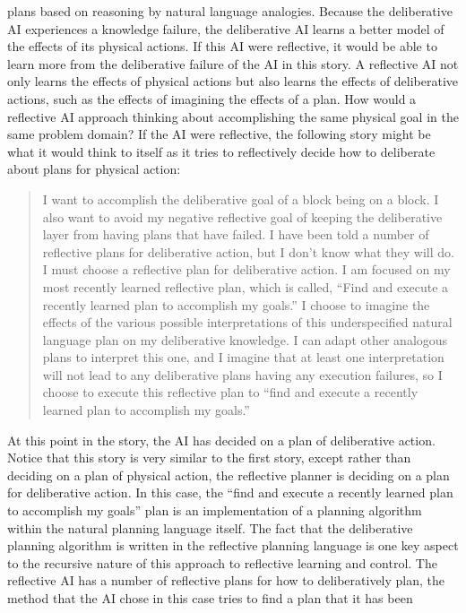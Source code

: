 plans based on reasoning by natural language analogies.  Because the
deliberative AI experiences a knowledge failure, the deliberative AI
learns a better model of the effects of its physical actions.  If this
AI were reflective, it would be able to learn more from the
deliberative failure of the AI in this story.  A reflective AI not
only learns the effects of physical actions but also learns the
effects of deliberative actions, such as the effects of imagining the
effects of a plan.  How would a reflective AI approach thinking about
accomplishing the same physical goal in the same problem domain?  If
the AI were reflective, the following story might be what it would
think to itself as it tries to reflectively decide how to deliberate
about plans for physical action:
\begin{quote}
  I want to accomplish the deliberative goal of a block being on a
  block.  I also want to avoid my negative reflective goal of keeping
  the deliberative layer from having plans that have failed.  I have
  been told a number of reflective plans for deliberative action, but
  I don't know what they will do.  I must choose a reflective plan for
  deliberative action.  I am focused on my most recently learned
  reflective plan, which is called, ``Find and execute a recently
  learned plan to accomplish my goals.''  I choose to imagine the
  effects of the various possible interpretations of this
  underspecified natural language plan on my deliberative knowledge.
  I can adapt other analogous plans to interpret this one, and I
  imagine that at least one interpretation will not lead to any
  deliberative plans having any execution failures, so I choose to
  execute this reflective plan to ``find and execute a recently
  learned plan to accomplish my goals.''
\end{quote}
At this point in the story, the AI has decided on a plan of
deliberative action.  Notice that this story is very similar to the
first story, except rather than deciding on a plan of physical action,
the reflective planner is deciding on a plan for deliberative action.
In this case, the ``find and execute a recently learned plan to
accomplish my goals'' plan is an implementation of a planning
algorithm within the natural planning language itself.  The fact that
the deliberative planning algorithm is written in the reflective
planning language is one key aspect to the recursive nature of this
approach to reflective learning and control.  The reflective AI has a
number of reflective plans for how to deliberatively plan, the method
that the AI chose in this case tries to find a plan that it has been
